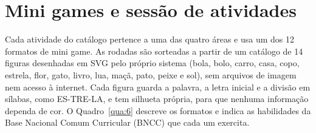 \section{Mini games e sessão de atividades}\label{sec:4.4}

Cada atividade do catálogo pertence a uma das quatro áreas e usa um dos 12 formatos de mini game. As rodadas são sorteadas a partir de um catálogo de 14 figuras desenhadas em SVG pelo próprio sistema (bola, bolo, carro, casa, copo, estrela, flor, gato, livro, lua, maçã, pato, peixe e sol), sem arquivos de imagem nem acesso à internet. Cada figura guarda a palavra, a letra inicial e a divisão em sílabas, como ES-TRE-LA, e tem silhueta própria, para que nenhuma informação dependa de cor. O Quadro~\ref{qua:6} descreve os formatos e indica as habilidades da Base Nacional Comum Curricular (BNCC) que cada um exercita.

